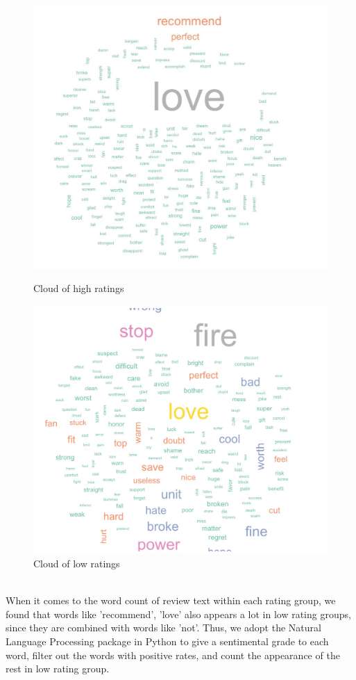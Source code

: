 \documentclass[12pt]{article}
\begin{document}
\begin{figure}[!htb]
   \begin{minipage}{0.48\textwidth}
     \centering
     \includegraphics[width=.8\linewidth]{hair45.jpeg}
     \caption{Cloud of high ratings}\label{Fig:4,5}
   \end{minipage}\hfill
   \begin{minipage}{0.48\textwidth}
     \centering
     \includegraphics[width=.8\linewidth]{hair12.jpeg}
     \caption{Cloud of low ratings}\label{Fig:1,2}
   \end{minipage}
\end{figure} \\
When it comes to the word count of review text within each rating group, we found that words like 'recommend', 'love' also appears a lot in low rating groups, since they are combined with words like 'not'. Thus, we adopt the Natural Language Processing package in Python to give a sentimental grade to each word, filter out the words with positive rates, and count the appearance of the rest in low rating group.
\end{document}
